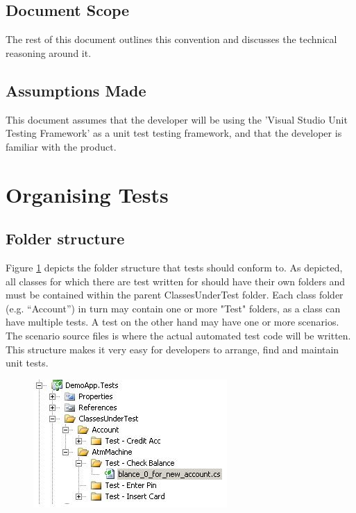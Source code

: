 \documentclass[a4paper,12pt]{article}
\begin{document}
\subsection{Document Scope}
The rest of this document outlines this convention and discusses the technical reasoning around it.
\subsection{Assumptions Made}
This document assumes that the developer will be using the 'Visual Studio Unit Testing Framework'\cite{testFramework} as a unit test testing framework, and that the developer is familiar with the product.

\section{Organising Tests}
\subsection{Folder structure}
Figure \ref{fig1} depicts the folder structure that tests should conform to. As depicted, all classes for which there are test written for should have their own folders and must be contained within the parent ClassesUnderTest folder. Each class folder (e.g. “Account”) in turn may contain one or more "Test" folders, as a class can have multiple tests. A test on the other hand may have one or more scenarios. The scenario source files is where the actual automated test code will be written.\\
\linebreak
This structure makes it very easy for developers to arrange, find and maintain unit tests.

\begin{center}
	\begin{figure}
		\includegraphics{solution_exlorer.JPG}
			\caption{}	
			\label{fig1}       
	\end{figure}	
\end{center}
\end{document}
